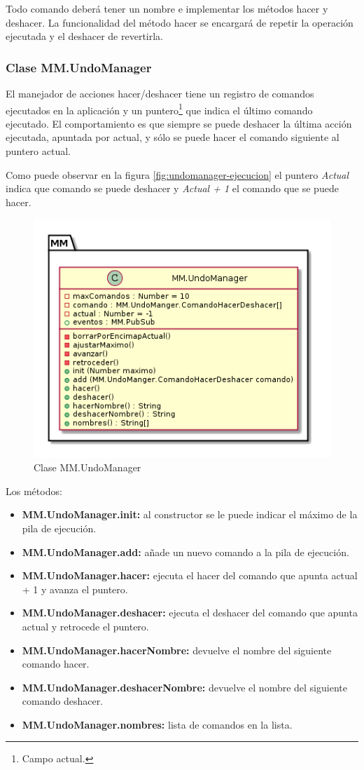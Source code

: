 Todo comando deberá tener un nombre e implementar los métodos hacer y deshacer. La funcionalidad del 
método hacer se encargará de repetir la operación ejecutada y el deshacer de revertirla.

\subsubsection{Clase MM.UndoManager}

El manejador de acciones hacer/deshacer tiene un registro de comandos ejecutados en la aplicación y un puntero\footnote{Campo actual.} que indica el último comando ejecutado. El comportamiento es que siempre se puede deshacer la última acción ejecutada, apuntada por actual, y sólo se puede hacer el comando siguiente al puntero actual.


 
Como puede observar en la figura \ref{fig:undomanager-ejecucion} el puntero \textit{Actual} indica que comando se puede deshacer y \textit{Actual + 1} el comando que se puede hacer. 

\begin{figure}[tbph]
\centering
\includegraphics[width=0.7\linewidth]{imagenes/diagrama-clase-mm-undomanager}
\caption{Clase MM.UndoManager}
\label{fig:diagrama-clase-mm-undomanager}
\end{figure}

Los métodos:
\begin{itemize}
\item \textbf{MM.UndoManager.init:} al constructor se le puede indicar el máximo de la pila 
de ejecución.
\item \textbf{MM.UndoManager.add:} añade un nuevo comando a la pila de ejecución.
\item \textbf{MM.UndoManager.hacer:} ejecuta el hacer del comando que apunta actual + 1 y avanza 
el puntero. 
\item \textbf{MM.UndoManager.deshacer:} ejecuta el deshacer del comando que apunta actual y 
retrocede el puntero.
\item \textbf{MM.UndoManager.hacerNombre:} devuelve el nombre del siguiente comando hacer.
\item \textbf{MM.UndoManager.deshacerNombre:} devuelve el nombre del siguiente comando deshacer.
\item \textbf{MM.UndoManager.nombres:} lista de comandos en la lista.
\end{itemize}






